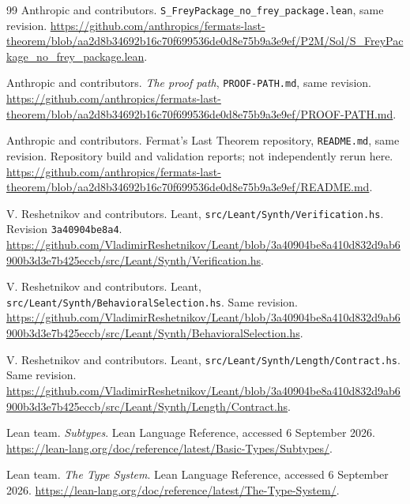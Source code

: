 \documentclass[11pt,a4paper]{article}
\theoremstyle{definition}
\theoremstyle{remark}
\newcommand{\code}[1]{\texttt{#1}}
\begin{document}
\begin{thebibliography}{99}
 Anthropic and contributors. \code{S\_FreyPackage\_no\_frey\_package.lean}, same revision.\newline
\url{https://github.com/anthropics/fermats-last-theorem/blob/aa2d8b34692b16c70f699536de0d8e75b9a3e9ef/P2M/Sol/S_FreyPackage_no_frey_package.lean}.

 Anthropic and contributors. \emph{The proof path}, \code{PROOF-PATH.md}, same revision.\newline
\url{https://github.com/anthropics/fermats-last-theorem/blob/aa2d8b34692b16c70f699536de0d8e75b9a3e9ef/PROOF-PATH.md}.

 Anthropic and contributors. Fermat's Last Theorem repository, \code{README.md}, same revision. Repository build and validation reports; not independently rerun here.\newline
\url{https://github.com/anthropics/fermats-last-theorem/blob/aa2d8b34692b16c70f699536de0d8e75b9a3e9ef/README.md}.

 V. Reshetnikov and contributors. Leant, \code{src/Leant/Synth/Verification.hs}. Revision \code{3a40904be8a4}.\newline
\url{https://github.com/VladimirReshetnikov/Leant/blob/3a40904be8a410d832d9ab6900b3d3e7b425eccb/src/Leant/Synth/Verification.hs}.

 V. Reshetnikov and contributors. Leant, \code{src/Leant/Synth/BehavioralSelection.hs}. Same revision.\newline
\url{https://github.com/VladimirReshetnikov/Leant/blob/3a40904be8a410d832d9ab6900b3d3e7b425eccb/src/Leant/Synth/BehavioralSelection.hs}.

 V. Reshetnikov and contributors. Leant, \code{src/Leant/Synth/Length/Contract.hs}. Same revision.\newline
\url{https://github.com/VladimirReshetnikov/Leant/blob/3a40904be8a410d832d9ab6900b3d3e7b425eccb/src/Leant/Synth/Length/Contract.hs}.

 Lean team. \emph{Subtypes}. Lean Language Reference, accessed 6 September 2026.\newline
\url{https://lean-lang.org/doc/reference/latest/Basic-Types/Subtypes/}.

 Lean team. \emph{The Type System}. Lean Language Reference, accessed 6 September 2026.\newline
\url{https://lean-lang.org/doc/reference/latest/The-Type-System/}.


\end{thebibliography}
\end{document}
